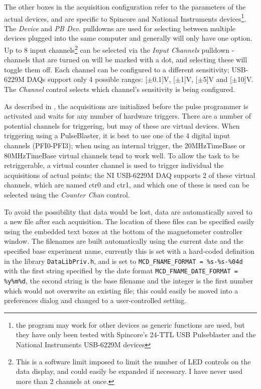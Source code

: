 \documentclass[PaulGanssle-Thesis.tex]{subfiles}
\begin{document}
The other boxes in the acquisition configuration refer to the parameters of the actual devices, and are specific to Spincore and National Instruments devices\footnote{the program may work for other devices as generic functions are used, but they have only been tested with Spincore's 24-TTL USB Pulseblaster and the National Instruments USB-6229M devices}. The \textit{Device} and \textit{PB Dev.} pulldowns are used for selecting between multiple devices plugged into the same computer and generally will only have one option. Up to 8 input channels\footnote{This is a software limit imposed to limit the number of LED controls on the data display, and could easily be expanded if necessary. I have never used more than 2 channels at once.} can be selected via the \textit{Input Channels} pulldown - channels that are turned on will be marked with a dot, and selecting these will toggle them off. Each channel can be configured to a different sensitivity; USB-6229M DAQs support only 4 possible ranges: \unit[$\pm$0.1]{V}, \unit[$\pm$1]{V}, \unit[$\pm$5]{V} and \unit[$\pm$10]{V}. The \textit{Channel} control selects which channel's sensitivity is being configured.

As described in , the acquisitions are initialized before the pulse programmer is activated and waits for any number of hardware triggers. There are a number of potential channels for triggering, but may of these are virtual devices. When triggering using a PulseBlaster, it is best to use one of the 4 digital input channels (PFI0-PFI3); when using an internal trigger, the 20MHzTimeBase or 80MHzTimeBase virtual channels tend to work well. To allow the task to be retriggerable, a virtual counter channel is used to trigger individual the acquisitions of actual points; the NI USB-6229M DAQ supports 2 of these virtual channels, which are named ctr0 and ctr1, and which one of these is used can be selected using the \textit{Counter Chan} control.

To avoid the possibility that data would be lost, data are automatically saved to a new file after each acquisition. The location of these files can be specified easily using the embedded text boxes at the bottom of the magnetometer controller window. The filenames are built automatically using the current date and the specified base experiment name, currently this is set with a hard-coded definition in the library \lstinline|DataLibPriv.h|, and is set to \lstinline|MCD_FNAME_FORMAT = %s-%s-%04d| with the first string specified by the date format \lstinline|MCD_FNAME_DATE_FORMAT = %y%m%d|, the second string is the base filename and the integer is the first number which would not overwrite an existing file; this could easily be moved into a preferences dialog and changed to a user-controlled setting.
\end{document}
